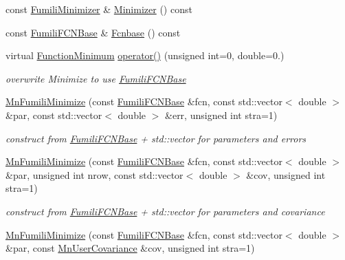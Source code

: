 \begin{DoxyCompactItemize}
const \mbox{\hyperlink{classROOT_1_1Minuit2_1_1FumiliMinimizer}{Fumili\+Minimizer}} \& \mbox{\hyperlink{classROOT_1_1Minuit2_1_1MnFumiliMinimize_a96eb0cf96ae7ec874f912b6d2b3e7990}{Minimizer}} () const
\item 
const \mbox{\hyperlink{classROOT_1_1Minuit2_1_1FumiliFCNBase}{Fumili\+F\+C\+N\+Base}} \& \mbox{\hyperlink{classROOT_1_1Minuit2_1_1MnFumiliMinimize_a4540fd0311c15810965864988d4c70d1}{Fcnbase}} () const
\item 
virtual \mbox{\hyperlink{classROOT_1_1Minuit2_1_1FunctionMinimum}{Function\+Minimum}} \mbox{\hyperlink{classROOT_1_1Minuit2_1_1MnFumiliMinimize_a408e4cc7d16335d7a9bfbb8765acec6d}{operator()}} (unsigned int=0, double=0.)
\begin{DoxyCompactList}\small\item\em overwrite Minimize to use \mbox{\hyperlink{classROOT_1_1Minuit2_1_1FumiliFCNBase}{Fumili\+F\+C\+N\+Base}} \end{DoxyCompactList}\item 
\mbox{\hyperlink{classROOT_1_1Minuit2_1_1MnFumiliMinimize_a2e8cffba3a44be7488ead2240a1d3149}{Mn\+Fumili\+Minimize}} (const \mbox{\hyperlink{classROOT_1_1Minuit2_1_1FumiliFCNBase}{Fumili\+F\+C\+N\+Base}} \&fcn, const std\+::vector$<$ double $>$ \&par, const std\+::vector$<$ double $>$ \&err, unsigned int stra=1)
\begin{DoxyCompactList}\small\item\em construct from \mbox{\hyperlink{classROOT_1_1Minuit2_1_1FumiliFCNBase}{Fumili\+F\+C\+N\+Base}} + std\+::vector for parameters and errors \end{DoxyCompactList}\item 
\mbox{\hyperlink{classROOT_1_1Minuit2_1_1MnFumiliMinimize_ad12e919e837251ef358a0d461355e51c}{Mn\+Fumili\+Minimize}} (const \mbox{\hyperlink{classROOT_1_1Minuit2_1_1FumiliFCNBase}{Fumili\+F\+C\+N\+Base}} \&fcn, const std\+::vector$<$ double $>$ \&par, unsigned int nrow, const std\+::vector$<$ double $>$ \&cov, unsigned int stra=1)
\begin{DoxyCompactList}\small\item\em construct from \mbox{\hyperlink{classROOT_1_1Minuit2_1_1FumiliFCNBase}{Fumili\+F\+C\+N\+Base}} + std\+::vector for parameters and covariance \end{DoxyCompactList}\item 
\mbox{\hyperlink{classROOT_1_1Minuit2_1_1MnFumiliMinimize_a48eae3f1c5b8eef3b6940d3fd5d26af8}{Mn\+Fumili\+Minimize}} (const \mbox{\hyperlink{classROOT_1_1Minuit2_1_1FumiliFCNBase}{Fumili\+F\+C\+N\+Base}} \&fcn, const std\+::vector$<$ double $>$ \&par, const \mbox{\hyperlink{classROOT_1_1Minuit2_1_1MnUserCovariance}{Mn\+User\+Covariance}} \&cov, unsigned int stra=1)

\end{DoxyCompactItemize}
